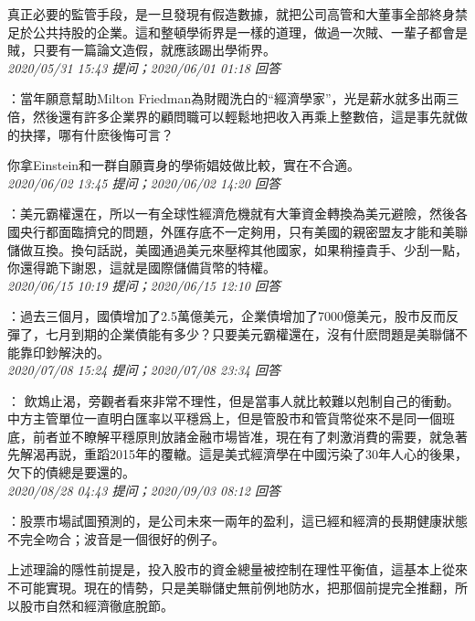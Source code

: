 \documentclass[twocolumn]{ctexart}
\begin{document}
真正必要的監管手段，是一旦發現有假造數據，就把公司高管和大董事全部終身禁足於公共持股的企業。這和整頓學術界是一樣的道理，做過一次賊、一輩子都會是賊，只要有一篇論文造假，就應該踢出學術界。
\\

\textit{\hfill\noindent\small 2020/05/31 15:43 提问；2020/06/01 01:18 回答}

：當年願意幫助Milton Friedman為財閥洗白的“經濟學家”，光是薪水就多出兩三倍，然後還有許多企業界的顧問職可以輕鬆地把收入再乘上整數倍，這是事先就做的抉擇，哪有什麽後悔可言？

你拿Einstein和一群自願賣身的學術娼妓做比較，實在不合適。
\\

\textit{\hfill\noindent\small 2020/06/02 13:45 提问；2020/06/02 14:20 回答}

：美元霸權還在，所以一有全球性經濟危機就有大筆資金轉換為美元避險，然後各國央行都面臨擠兌的問題，外匯存底不一定夠用，只有美國的親密盟友才能和美聯儲做互換。換句話説，美國通過美元來壓榨其他國家，如果稍擡貴手、少刮一點，你還得跪下謝恩，這就是國際儲備貨幣的特權。
\\

\textit{\hfill\noindent\small 2020/06/15 10:19 提问；2020/06/15 12:10 回答}

：過去三個月，國債增加了2.5萬億美元，企業債增加了7000億美元，股市反而反彈了，七月到期的企業債能有多少？只要美元霸權還在，沒有什麽問題是美聯儲不能靠印鈔解決的。
\\

\textit{\hfill\noindent\small 2020/07/08 15:24 提问；2020/07/08 23:34 回答}

：
飲鴆止渴，旁觀者看來非常不理性，但是當事人就比較難以剋制自己的衝動。 
中方主管單位一直明白匯率以平穩爲上，但是管股市和管貨幣從來不是同一個班底，前者並不瞭解平穩原則放諸金融市場皆准，現在有了刺激消費的需要，就急著先解渴再説，重蹈2015年的覆轍。這是美式經濟學在中國污染了30年人心的後果，欠下的債總是要還的。
\\

\textit{\hfill\noindent\small 2020/08/28 04:43 提问；2020/09/03 08:12 回答}

：股票市場試圖預測的，是公司未來一兩年的盈利，這已經和經濟的長期健康狀態不完全吻合；波音是一個很好的例子。

上述理論的隱性前提是，投入股市的資金總量被控制在理性平衡值，這基本上從來不可能實現。現在的情勢，只是美聯儲史無前例地防水，把那個前提完全推翻，所以股市自然和經濟徹底脫節。
\\
\end{document}
